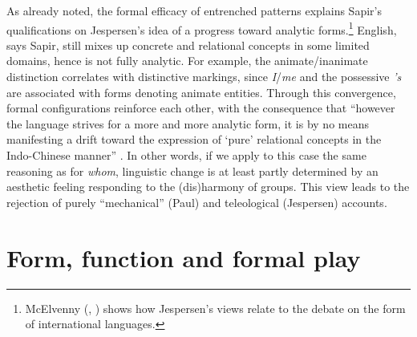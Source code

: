 \documentclass[output=paper]{langscibook}
\begin{document}
As already noted, the formal efficacy of entrenched patterns explains Sapir's qualifications on Jespersen's idea of a progress toward analytic forms.\footnote{McElvenny (\citeyear{McElvenny2013}, \citeyear{McElvenny2017b}) shows how Jespersen's views relate to the debate on the form of international languages.} English, says Sapir, still mixes up concrete and relational concepts in some limited domains, hence is not fully analytic. For example, the animate/inanimate distinction correlates with distinctive markings, since \emph{I}/\emph{me} and the possessive \emph{'s} are associated with forms denoting animate entities. Through this convergence, formal configurations reinforce each other, with the consequence that ``however the language strives for a more and more analytic form, it is by no means manifesting a drift toward the expression of `pure' relational concepts in the Indo-Chinese manner'' \citep[168]{Sapir1921}. In other words, if we apply to this case the same reasoning as for \emph{whom}, linguistic change is at least partly determined by an aesthetic feeling responding to the (dis)harmony of groups. This view leads to the rejection of purely ``mechanical'' (Paul) and teleological (Jespersen) accounts.

\section{Form, function and formal play}
\label{sec:fortis:formalplay}
\end{document}
